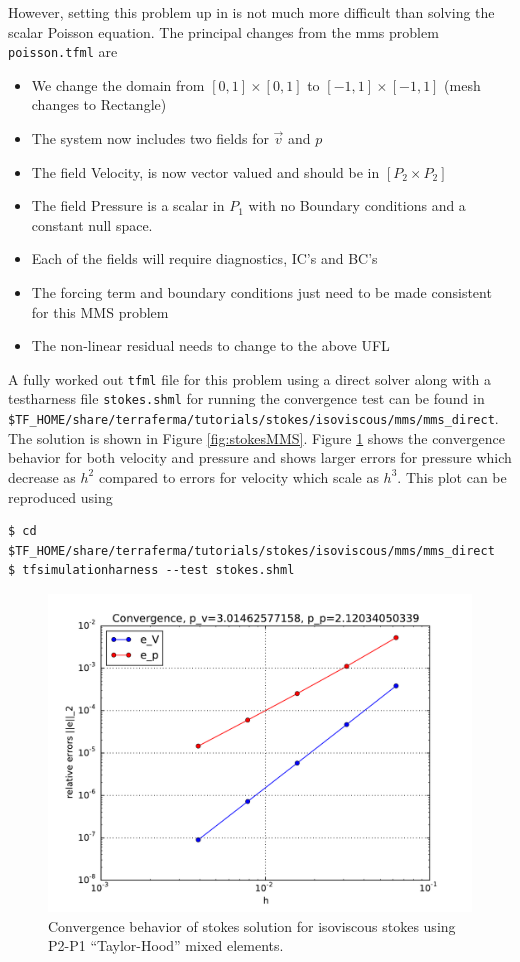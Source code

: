 However, setting this problem up in \TF{} is not
much more difficult than solving the scalar Poisson equation.  The
principal changes from the mms problem \texttt{poisson.tfml} are
\begin{itemize}
\setlength{\itemsep}{0em}
\item We  change the domain from $[0,1]\times[0,1]$ to
  $[-1,1]\times[-1,1]$ (mesh changes to Rectangle)
\item The system now includes two fields for $\vec{v}$ and $p$
\item The field Velocity, is now vector valued and should be in
  $[P_{2}\times P_{2}]$
\item The field Pressure is a scalar in $P_{1}$ with no Boundary
  conditions and a constant null space.
\item Each of the fields will require diagnostics, IC's and BC's
\item The forcing term and boundary conditions just need to be made
  consistent for this MMS problem
\item The non-linear residual needs to change to the above UFL
\end{itemize}

A fully worked out \texttt{tfml} file for this problem using a direct
solver along with a testharness file \texttt{stokes.shml} for running
the convergence test can be
found in \texttt{\$TF\_HOME/share/terraferma/tutorials/stokes/isoviscous/mms/mms\_direct}.
The solution is shown in Figure \ref{fig:stokesMMS}.  Figure
\ref{fig:stokes_convergence}  shows the convergence behavior for both
velocity and pressure and shows larger errors for pressure which
decrease as $h^{2}$ compared to errors for velocity which scale as
$h^{3}$. This plot can be reproduced using

\pagebreak{}
\begin{lstlisting}[style=Bash]
$ cd $TF_HOME/share/terraferma/tutorials/stokes/isoviscous/mms/mms_direct
$ tfsimulationharness --test stokes.shml
\end{lstlisting} %



\begin{figure}[htbp!]
  \centering
  \includegraphics[width=.7\textwidth]{figures/Stokes_convergence.pdf}
  \caption{Convergence behavior of stokes solution for isoviscous
    stokes using P2-P1 ``Taylor-Hood'' mixed elements.}
  \label{fig:stokes_convergence}
\end{figure}

